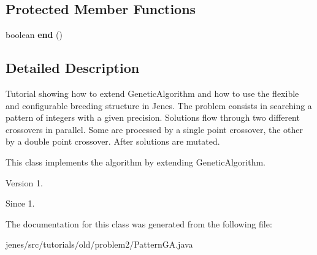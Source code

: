 \subsection*{Protected Member Functions}
\begin{DoxyCompactItemize}
\item 
\hypertarget{classjenes_1_1tutorials_1_1old_1_1problem2_1_1_pattern_g_a_a4c05b8a32518e4fe78f66e2576014bd9}{boolean {\bfseries end} ()}\label{classjenes_1_1tutorials_1_1old_1_1problem2_1_1_pattern_g_a_a4c05b8a32518e4fe78f66e2576014bd9}

\end{DoxyCompactItemize}


\subsection{Detailed Description}
Tutorial showing how to extend {\ttfamily Genetic\-Algorithm} and how to use the flexible and configurable breeding structure in Jenes. The problem consists in searching a pattern of integers with a given precision. Solutions flow through two different crossovers in parallel. Some are processed by a single point crossover, the other by a double point crossover. After solutions are mutated.

This class implements the algorithm by extending {\ttfamily Genetic\-Algorithm}.

\begin{DoxyVersion}{Version}
1.
\end{DoxyVersion}
\begin{DoxySince}{Since}
1. 
\end{DoxySince}


The documentation for this class was generated from the following file\-:\begin{DoxyCompactItemize}
\item 
jenes/src/tutorials/old/problem2/Pattern\-G\-A.\-java\end{DoxyCompactItemize}
